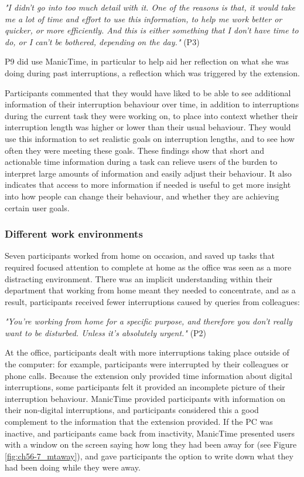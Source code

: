 \textit{"I didn’t go into too much detail with it. One of the reasons is that, it would take me a lot of time and effort to use this information, to help me work better or quicker, or more efficiently. And this is either something that I don’t have time to do, or I can’t be bothered, depending on the day."} (P3)

P9 did use ManicTime, in particular to help aid her reflection on what she was doing during past interruptions, a reflection which was triggered by the extension. 

Participants commented that they would have liked to be able to see additional information of their interruption behaviour over time, in addition to interruptions during the current task they were working on, to place into context whether their interruption length was higher or lower than their usual behaviour. They would use this information to set realistic goals on interruption lengths, and to see how often they were meeting these goals.
These findings show that short and actionable time information during a task can relieve users of the burden to interpret large amounts of information and easily adjust their behaviour. It also indicates that access to more information if needed is useful to get more insight into how people can change their behaviour, and whether they are achieving certain user goals. 

\subsubsection{Different work environments}
Seven participants worked from home on occasion, and saved up tasks that required focused attention to complete at home as the office was seen as a more distracting environment. There was an implicit understanding within their department that working from home meant they needed to concentrate, and as a result, participants received fewer interruptions caused by queries from colleagues:

\textit{"You’re working from home for a specific purpose, and therefore you don’t really want to be disturbed. Unless it’s absolutely urgent."} (P2) 

At the office, participants dealt with more interruptions taking place outside of the computer: for example, participants were interrupted by their colleagues or phone calls. Because the extension only provided time information about digital interruptions, some participants felt it provided an incomplete picture of their interruption behaviour. ManicTime provided participants with information on their non-digital interruptions, and participants considered this a good complement to the information that the extension provided. If the PC was inactive, and participants came back from inactivity, ManicTime presented users with a window on the screen saying how long they had been away for (see  Figure \ref{fig:ch56-7_mtaway}), and gave participants the option to write down what they had been doing while they were away.

